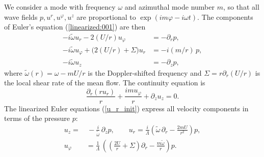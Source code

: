 \documentclass[aps,twocolumn]{revtex4-2}
\begin{document}
We consider a mode with frequency $\omega$ and azimuthal mode number $m$, so that all wave fields $p, u^r, u^\varphi, u^z$ are proportional to $\exp(im\varphi - i \omega t)$. The components of Euler's equation (\ref{linearized:001}) are then
\begin{equation}\label{u_r_init}
	\begin{aligned}
		-i\widetilde \omega u_r - 2(U/r)u_\varphi & = -\partial_r p,
		\\[5pt]
		-i\widetilde \omega u_\varphi +
		\big(2(U/r) + \Sigma\big) u_r             &
		= -i(m/r)\,p,
		\\[5pt]
		-i\widetilde \omega u_z                   & = -\partial_z p,
	\end{aligned}
\end{equation}
where $\widetilde \omega(r) = \omega - m U/r$ is the Doppler-shifted frequency and $\Sigma = r \partial_r (U/r)$ is the local shear rate of the mean flow. The continuity equation is
\begin{equation}\label{continuity-eq}
	\frac{\partial_r(r u_r)}{r} +\frac{im u_\varphi}{r} + \partial_z u_z
	= 0.
\end{equation}
The linearized Euler equations (\ref{u_r_init}) express all velocity components in terms of the pressure $p$:
\begin{equation}
	\begin{aligned}
		u_z =     & \,-\frac{i}{\widetilde\omega }\,\partial_z p,
		\qquad
		u_r = \frac{i}{\Lambda}
		\left(
		\widetilde\omega\,\partial_r - \frac{2mU}{r^2}
		\right)p,
		\\[5pt]
		u_\varphi & = \frac{1}{\Lambda }\, \left(
		\left(\frac{2U}{r}+\Sigma\right)\partial_r -\frac{m\widetilde \omega}{r}
		\right)p.
	\end{aligned}
\end{equation}
\end{document}
